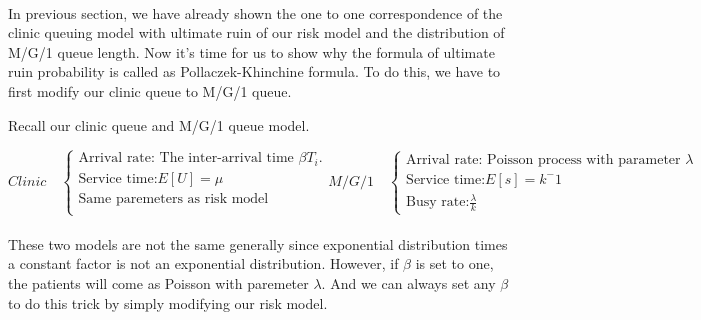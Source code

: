 \documentclass[project2.tex]{subfiles}
\begin{document}
\paragraph{}
In previous section, we have already shown the one to one correspondence of the clinic queuing model with ultimate ruin of our risk model and the distribution of M/G/1 queue length. Now it's time for us to show why the formula of  ultimate ruin probability is called as Pollaczek-Khinchine formula. To do this, we have to first modify our clinic queue to M/G/1 queue.

Recall our clinic queue and  M/G/1 queue model.
\begin{scriptsize}
\begin{equation*}
Clinic\quad\left\{
\begin{array}{lcl}
\text{Arrival rate: The inter-arrival time $\beta T_i$.}\\
\text{Service time:$E[U]=\mu$}\\
\text{Same paremeters as risk model}\\
\end{array} 
\right.
M/G/1\quad\left\{
\begin{array}{lcl}
\text{Arrival rate: Poisson process with parameter $\lambda$                      }\\
\text{Service time:$E[s]=k^-1$}\\
\text{Busy rate:$\frac{\lambda}{k}$}
\end{array} 
\right.
\end{equation*} 
\end{scriptsize} 
\paragraph{}
These two models are not the same generally since exponential distribution times a constant factor is not an exponential distribution. However, if $\beta$ is set to one, the patients will come as Poisson with paremeter $\lambda$. And we can always set any $\beta$ to do this trick by simply modifying our risk model.
\end{document}
